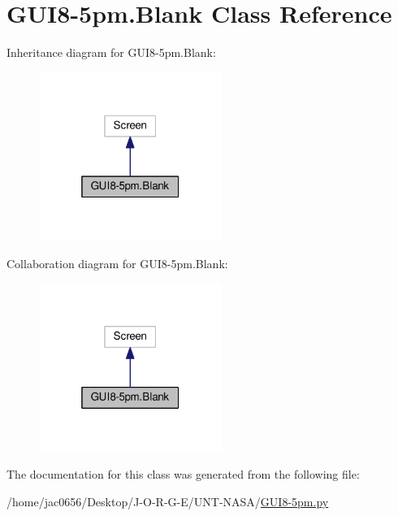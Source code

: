 \hypertarget{classGUI8-5pm_1_1Blank}{}\section{G\+U\+I8-\/5pm.Blank Class Reference}
\label{classGUI8-5pm_1_1Blank}


Inheritance diagram for G\+U\+I8-\/5pm.Blank\+:
\nopagebreak
\begin{figure}[H]
\begin{center}
\leavevmode
\includegraphics[width=169pt]{classGUI8-5pm_1_1Blank__inherit__graph}
\end{center}
\end{figure}


Collaboration diagram for G\+U\+I8-\/5pm.Blank\+:
\nopagebreak
\begin{figure}[H]
\begin{center}
\leavevmode
\includegraphics[width=169pt]{classGUI8-5pm_1_1Blank__coll__graph}
\end{center}
\end{figure}


The documentation for this class was generated from the following file\+:\begin{DoxyCompactItemize}
\item 
/home/jac0656/\+Desktop/\+J-\/\+O-\/\+R-\/\+G-\/\+E/\+U\+N\+T-\/\+N\+A\+S\+A/\hyperlink{GUI8-5pm_8py}{G\+U\+I8-\/5pm.\+py}\end{DoxyCompactItemize}

